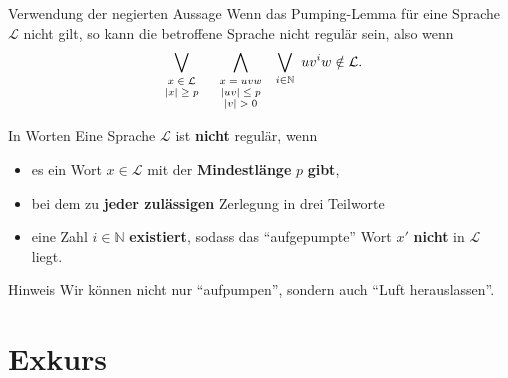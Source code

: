 \documentclass[]{beamer}
\begin{document}
\begin{frame}[squeeze]{}
  \begin{block}{Verwendung der negierten Aussage}
    Wenn das Pumping-Lemma für eine Sprache $\mathcal{L}$ nicht gilt, so kann die betroffene Sprache nicht regulär sein, also wenn
    \[  \bigvee_{\begin{scriptsize} \begin{array}{c} x \in \mathcal{L} \\ |x| \geq p \end{array} \end{scriptsize}}
      ~
        \bigwedge_{\begin{scriptsize} \begin{array}{c} x = uvw \\ |uv| \leq p \\ |v| > 0 \end{array} \end{scriptsize}}
      ~
        \bigvee_{i \in \mathbb{N}}
      ~
        uv^iw \notin \mathcal{L}. \]
  \end{block}
  
  \pause
  \vspace*{-0.25em}
  
  \begin{exampleblock}{In Worten}
    Eine Sprache $\mathcal{L}$ ist \textbf{nicht} regulär, wenn
    \pause
    \begin{itemize}
      \item es ein Wort $x \in \mathcal{L}$ mit der \textbf{Mindestlänge} $p$ \textbf{gibt},
      \pause
      \item bei dem zu \textbf{jeder zulässigen} Zerlegung in drei Teilworte
      \pause
      \item eine Zahl $i \in \mathbb{N}$ \textbf{existiert}, sodass das \enquote{aufgepumpte} Wort $x'$ \textbf{nicht} in $\mathcal{L}$ liegt.
    \end{itemize}
  \end{exampleblock}
  
  \pause
  \vspace*{-0.25em}
  
  \begin{alertblock}{Hinweis}
    Wir können nicht nur \enquote{aufpumpen}, sondern auch \enquote{Luft herauslassen}.
  \end{alertblock}
\end{frame}

\section{Exkurs}
\end{document}
